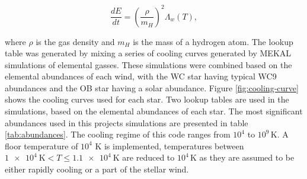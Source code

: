 \documentclass[fleqn,usenatbib]{mnras}
\begin{document}
\begin{equation}
  \frac{dE}{dt} = \left(\frac{\rho}{m_H}\right)^2 \Lambda_w(T),
\end{equation}

\noindent
where $\rho$ is the gas density and $m_H$ is the mass of a hydrogen atom.
The lookup table was generated by mixing a series of cooling curves generated by MEKAL simulations of elemental gasses.
These simulations were combined based on the elemental abundances of each wind, with the WC star having typical WC9 abundances and the OB star having a solar abundance.
%
%
Figure \ref{fig:cooling-curve} shows the cooling curves used for each star.
Two lookup tables are used in the simulations, based on the elemental abundances of each star. 
The most significant abundances used in this projects simulations are presented in table \ref{tab:abundances}.
The cooling regime of this code ranges from $10^4$ to $10^9\,\si{\kelvin}$.
A floor temperature of $10^4$ \si{\kelvin} is implemented, temperatures between $\SI{1e4}{\kelvin} < T \leq \SI{1.1e4}{\kelvin}$ are reduced to $10^4\,\si{\kelvin}$ as they are assumed to be either rapidly cooling or a part of the stellar wind.
\end{document}
